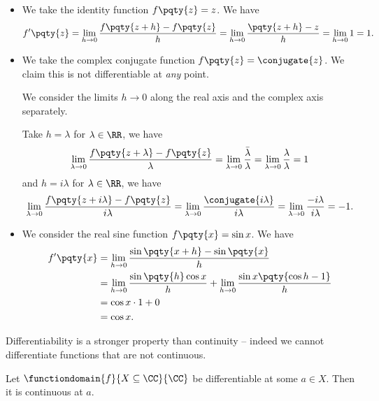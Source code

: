 \begin{examples}
    \label{ex:differentiability}%
    \begin{itemize}
        \item We take the identity function \(f\pqty{z} = z\). We have
        \[
            f'\pqty{z} = \lim_{h \to 0} \frac{f\pqty{z + h} - f\pqty{z}}{h} = \lim_{h \to 0} \frac{\pqty{z + h} - z}{h} = \lim_{h \to 0} 1 = 1.
        \]

        \item We take the complex conjugate function \(f\pqty{z} = \conjugate{z}\). We claim this is not differentiable at \emph{any} point.
        
        We consider the limits \(h \to 0\) along the real axis and the complex axis separately.

        Take \(h = \lambda\) for \(\lambda \in \RR\), we have
        \[
            \lim_{\lambda \to 0} \frac{f\pqty{z + \lambda} - f\pqty{z}}{\lambda} = \lim_{\lambda \to 0} \frac{\bar{\lambda}}{\lambda} = \lim_{\lambda \to 0} \frac{\lambda}{\lambda} = 1
        \]
        and \(h = i \lambda\) for \(\lambda \in \RR\), we have
        \[
            \lim_{\lambda \to 0} \frac{f\pqty{z + i \lambda} - f\pqty{z}}{i\lambda} = \lim_{\lambda \to 0} \frac{\conjugate{i \lambda}}{i \lambda} = \lim_{\lambda \to 0} \frac{- i \lambda}{i \lambda} = -1.
        \]

        \item We consider the real sine function \(f\pqty{x} = \sin x\). We have
        \begin{align*}
            f'\pqty{x} &= \lim_{h \to 0} \frac{\sin \pqty{x + h} - \sin \pqty{x}}{h} \\
            &= \lim_{h \to 0} \frac{\sin \pqty{h} \cos x}{h} + \lim_{h \to 0} \frac{\sin x \pqty{\cos h - 1}}{h} \\
            &= \cos x \cdot 1 + 0 \\
            &= \cos x.
        \end{align*}
    \end{itemize}
\end{examples}

Differentiability is a stronger property than continuity -- indeed we cannot differentiate functions that are not continuous.

\begin{proposition}
    \label{prop:differentiability-implies-continuity}%
    Let \(\functiondomain{f}{X \subseteq \CC}{\CC}\) be differentiable at some \(a \in X\). Then it is continuous at \(a\).
\end{proposition}

